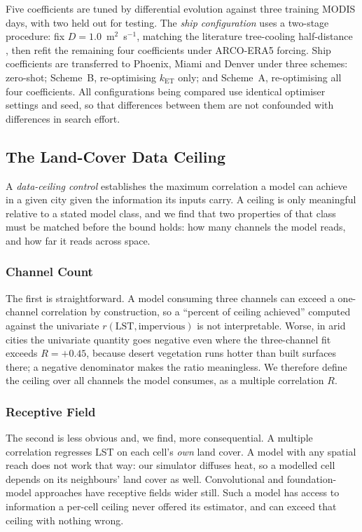 \documentclass[remotesensing,article,submit,oneauthor]{Definitions/mdpi}
\begin{document}
Five coefficients are tuned by differential evolution
\cite{storn1997differential} against three training MODIS days, with two
held out for testing. The \emph{ship configuration} uses a two-stage
procedure: fix $D = 1.0$~m$^2$~s$^{-1}$, matching the literature
tree-cooling half-distance \cite{ziter2019scale}, then refit the
remaining four coefficients under ARCO-ERA5 forcing. Ship coefficients are
transferred to Phoenix, Miami and Denver under three schemes: zero-shot;
Scheme~B, re-optimising $k_{\mathrm{ET}}$ only; and Scheme~A,
re-optimising all four coefficients. All configurations being compared use
identical optimiser settings and seed, so that differences between them
are not confounded with differences in search effort.

\subsection{The Land-Cover Data Ceiling}

A \emph{data-ceiling control} establishes the maximum correlation a model
can achieve in a given city given the information its inputs carry. A
ceiling is only meaningful relative to a stated model class, and we find
that two properties of that class must be matched before the bound holds:
how many channels the model reads, and how far it reads across space.

\subsubsection{Channel Count}

The first is straightforward. A model consuming three channels can exceed
a one-channel correlation by construction, so a ``percent of ceiling
achieved'' computed against the univariate $r(\mathrm{LST},
\text{impervious})$ is not interpretable. Worse, in arid cities the
univariate quantity goes negative even where the three-channel fit exceeds
$R = +0.45$, because desert vegetation runs hotter than built surfaces
there; a negative denominator makes the ratio meaningless. We therefore
define the ceiling over all channels the model consumes, as a multiple
correlation $R$.

\subsubsection{Receptive Field}
\label{sec:receptive}

The second is less obvious and, we find, more consequential. A multiple
correlation regresses LST on each cell's \emph{own} land cover. A model
with any spatial reach does not work that way: our simulator diffuses
heat, so a modelled cell depends on its neighbours' land cover as well.
Convolutional and foundation-model approaches
\cite{lyu2022integrated,hoang2025geospatial} have receptive fields wider
still. Such a model has access to information a per-cell ceiling never
offered its estimator, and can exceed that ceiling with nothing wrong.
\end{document}
